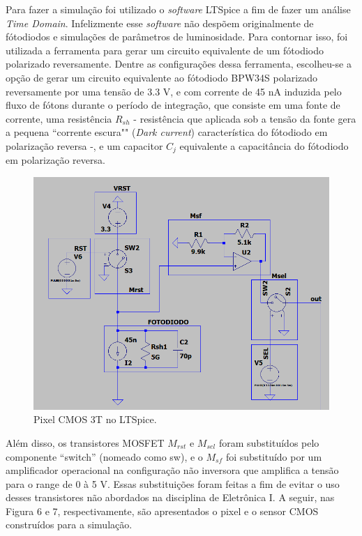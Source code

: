 \documentclass[10pt,a4paper,twocolumn]{article}
\begin{document}
	Para fazer a simulação foi utilizado o \textit{software} LTSpice a fim de fazer um análise \textit{Time Domain}. Infelizmente esse \textit{software} não despõem originalmente de fótodiodos e simulações de parâmetros de luminosidade. Para contornar isso, foi utilizada a ferramenta \cite{photodiode} para gerar um circuito equivalente de um fótodiodo polarizado reversamente. Dentre as configurações dessa ferramenta, escolheu-se a opção de gerar um circuito equivalente ao fótodiodo BPW34S \cite{BPW34} polarizado reversamente por uma tensão de 3.3 V, e com corrente de 45 nA induzida pelo fluxo de fótons durante o período de integração, que consiste em uma fonte de corrente, uma resistência $R_{sh}$ - resistência que aplicada sob a tensão da fonte gera a pequena ``corrente escura"" (\textit{Dark current}) característica do fótodiodo em polarização reversa -, e um capacitor $C_{j}$ equivalente a capacitância do fótodiodo em polarização reversa.
	
	\begin{figure}[!h]
		\centering
		\includegraphics[scale=0.3]{imagens/pixel_simulado.png}
		\caption{Pixel CMOS 3T no LTSpice.}
	\end{figure}
	
	Além disso, os transistores MOSFET $M_{rst}$ e $M_{sel}$ foram substituídos pelo componente ``switch'' (nomeado como sw), e o $M_{sf}$ foi substituído por um amplificador operacional na configuração não inversora que amplifica a tensão para o range de 0 à 5 V. Essas substituições foram feitas a fim de evitar o uso desses transistores não abordados na disciplina de Eletrônica I. A seguir, nas Figura 6 e 7, respectivamente, são apresentados o pixel e o sensor CMOS construídos para a simulação.
	
\end{document}
